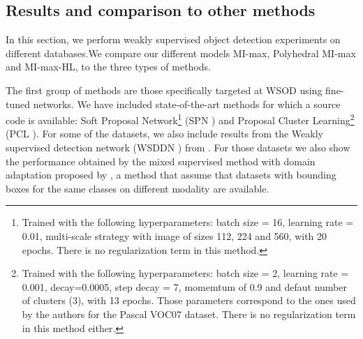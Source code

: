 \documentclass[preprint]{elsarticle}
\newcommand\MILS{MI-max}
\newcommand\mimaxaddlayerS{MI-max-HL}
\newcommand\MaxOfMaxS{Polyhedral MI-max}
\begin{document}
\subsection{Results and comparison to other methods}
\label{sec:ExpResults}

In this section, we perform weakly supervised object detection experiments on different databases.We compare our different models \MILS{}, \MaxOfMaxS{} and \mimaxaddlayerS{}, to the three types of methods. 

The first group of methods are those specifically targeted at WSOD using fine-tuned networks. We have included state-of-the-art methods for which a source code is available: Soft Proposal Network\footnote{ Trained with the following hyperparameters: batch size = 16, learning rate = 0.01, multi-scale strategy with image of sizes 112, 224 and 560, with 20 epochs. There is no regularization term in this method.} (SPN \citep{zhu_soft_2017}) and Proposal Cluster Learning\footnote{ Trained with the following hyperparameters: batch size = 2, learning rate = 0.001, decay=0.0005, step decay = 7, momemtum of 0.9 and defaut number of clusters (3), with 13 epochs. Those parameters correspond to the ones used by the authors for the Pascal VOC07 dataset. There is no regularization term in this method either.} (PCL \citep{tang_pcl_2018}). For some of the datasets, we also include results from the Weakly supervised detection network (WSDDN \citep{bilen_weakly_2016}) from \citep{inoue_crossdomain_2018}.  For those datasets we also show the performance obtained by the mixed supervised method with domain adaptation proposed by \citep{inoue_crossdomain_2018}, a method that assume that datasets with bounding boxes for the same classes on different modality are available. 
\end{document}
